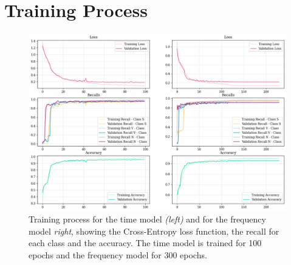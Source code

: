 \documentclass[conference]{IEEEtran}
\begin{document}
\section{Training Process}
\begin{figure}[h]
    \centering
    \includegraphics[width=\linewidth]{img/training.png}
    \caption{Training process for the time model \textit{(left)} and for the
    frequency model \textit{right}, showing the Cross-Entropy loss function, the
    recall for each class and the accuracy. The time model is trained for 100
    epochs and the frequency model for 300 epochs.}
    \label{app:training}
\end{figure}
\end{document}
